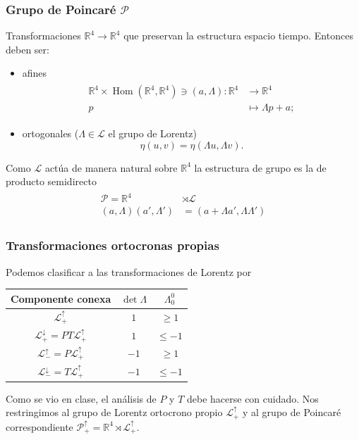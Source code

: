 \documentclass{beamer}
\DeclareMathOperator{\Hom}{Hom}
\begin{document}
\begin{frame}
\frametitle{Grupo de Poincaré $\mathcal{P}$}
Transformaciones $\mathbb{R}^4\rightarrow\mathbb{R}^4$ que preservan la estructura espacio tiempo. Entonces deben ser:
\begin{itemize}
\item afines
\begin{align}
\begin{split}
\mathbb{R}^4\times \Hom(\mathbb{R}^4,\mathbb{R}^4) \ni(a,\Lambda):\mathbb{R}^4&\rightarrow\mathbb{R}^4 \\
p & \mapsto \Lambda p + a ;
\end{split}
\end{align}
\item ortogonales ($\Lambda\in \mathcal{L}$ el grupo de Lorentz)
\begin{equation}
\eta(u,v)=\eta(\Lambda u, \Lambda v).
\end{equation}
\end{itemize}
Como $\mathcal{L}$ actúa de manera natural sobre $\mathbb{R}^4$ la estructura de grupo es la de producto semidirecto
\begin{align}
\begin{split}
\mathcal{P} = \mathbb{R}^4&\rtimes \mathcal{L} \\
(a,\Lambda)(a',\Lambda')& = (a + \Lambda a', \Lambda\Lambda ')
\end{split}
\end{align}
\end{frame}

\begin{frame}
\frametitle{Transformaciones ortocronas propias}
Podemos clasificar a las transformaciones de Lorentz por \cite{Scheck2010}
\begin{center}
\begin{tabular}{|c|c|c|}
\hline
Componente conexa & $\det \Lambda$ & $\Lambda^0_0$ \\
\hline
$\mathcal{L}_+^\uparrow$ & $1$ & $\geq 1$ \\ 
$\mathcal{L}_+^\downarrow = PT\mathcal{L}_+^\uparrow$ & $1$ & $\leq -1$ \\ 
$\mathcal{L}_-^\uparrow = P\mathcal{L}_+^\uparrow$ & $-1$ & $\geq 1$ \\ 
$\mathcal{L}_-^\downarrow = T \mathcal{L}_+^\uparrow$ & $-1$ & $\leq -1$ \\
\hline 
\end{tabular}
\end{center}
Como se vio en clase, el análisis de $P$ y $T$ debe hacerse con cuidado. Nos restringimos al grupo de Lorentz ortocrono propio $\mathcal{L}_+^\uparrow$ y al grupo de Poincaré correspondiente $\mathcal{P}_+^\uparrow = \mathbb{R}^4\rtimes \mathcal{L}_+^\uparrow$.
\end{frame}
\end{document}
